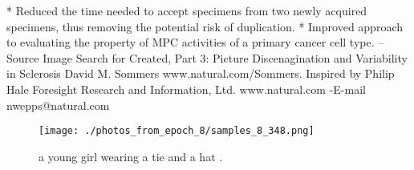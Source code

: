 \documentclass{article}%
\begin{document}
* Reduced the time needed to accept specimens from two newly acquired specimens, thus removing the potential risk of duplication.\newline%
* Improved approach to evaluating the property of MPC activities of a primary cancer cell type.\newline%
–\newline%
Source\newline%
Image Search for Created, Part 3: Picture Discenagination and Variability in Sclerosis\newline%
David M. Sommers\newline%
www.natural.com/Sommers. Inspired by Philip Hale\newline%
Foresight Research and Information, Ltd. www.natural.com\newline%
{-}E{-}mail nwepps@natural.com\newline%

%


\begin{figure}[h!]%
\centering%
\texttt{[image: ./photos\_from\_epoch\_8/samples\_8\_348.png]}%
\caption{a young girl wearing a tie and a hat .}%
\end{figure}

%
\end{document}
